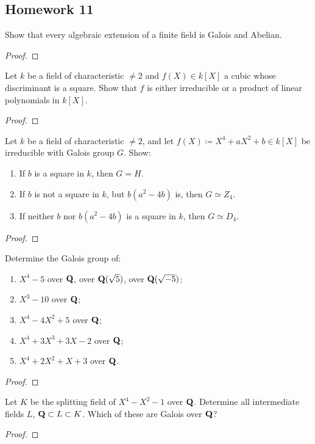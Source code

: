 \subsection{Homework 11}
\begin{problem}
Show that every algebraic extension of a finite field is Galois and
Abelian.
\end{problem}
\begin{proof}
\end{proof}

\begin{problem}
Let $k$ be a field of characteristic $\neq 2$ and $f(X)\in k[X]$ a cubic
whose discriminant is a square. Show that $f$ is either irreducible or a
product of linear polynomials in $k[X]$.
\end{problem}
\begin{proof}
\end{proof}

\begin{problem}
Let $k$ be a field of characteristic $\neq 2$, and let $f(X)\coloneqq
X^4+aX^2+b\in k[X]$ be irreducible with Galois group $G$. Show:
\begin{enumerate}[label=(\roman*),noitemsep]
\item If $b$ is a square in $k$, then $G=H$.
\item If $b$ is not a square in $k$, but $b(a^2-4b)$ is, then $G\simeq
  Z_4$.
\item If neither $b$ nor $b(a^2-4b)$ is a square in $k$, then $G\simeq
  D_4$.
\end{enumerate}
\end{problem}
\begin{proof}
\end{proof}

\begin{problem}
Determine the Galois group of:
\begin{enumerate}[label=(\alph*),noitemsep]
\item $X^4-5$ over $\mathbf{Q}$, over $\mathbf{Q}(\sqrt{5})$, over $\mathbf{Q}(\sqrt{-5})$;
\item $X^3-10$ over $\mathbf{Q}$;
\item $X^4-4X^2+5$ over $\mathbf{Q}$;
\item $X^4+3X^3+3X-2$ over $\mathbf{Q}$;
\item $X^4+2X^2+X+3$ over $\mathbf{Q}$.
\end{enumerate}
\end{problem}
\begin{proof}
\end{proof}

\begin{problem}
Let $K$ be the splitting field of $X^4-X^2-1$ over $\mathbf{Q}$. Determine all
intermediate fields $L$, $\mathbf{Q}\subset L\subset K$. Which of these are
Galois over $\mathbf{Q}$?
\end{problem}
\begin{proof}
\end{proof}

